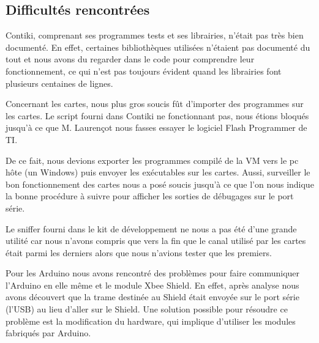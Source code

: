 
\subsection{Difficultés rencontrées}

Contiki, comprenant ses programmes tests et ses librairies, n'était pas très bien documenté.
En effet, certaines bibliothèques utilisées n'étaient pas documenté du tout et nous avons du regarder dans le code pour comprendre leur fonctionnement, ce qui n'est pas toujours évident quand les librairies font plusieurs centaines de lignes.


Concernant les cartes, nous plus gros soucis fût d'importer des programmes sur les cartes.
Le script fourni dans Contiki ne fonctionnant pas, nous étions bloqués jusqu'à ce que M. Laurençot nous fasses essayer le logiciel Flash Programmer de TI.

De ce fait, nous devions exporter les programmes compilé de la VM vers le pc hôte (un Windows) puis envoyer les exécutables sur les cartes.
Aussi, surveiller le bon fonctionnement des cartes nous a posé soucis jusqu'à ce que l'on nous indique la bonne procédure à suivre pour afficher les sorties de débugages sur le port série.


Le sniffer fourni dans le kit de développement ne nous a pas été d'une grande utilité car nous n'avons compris que vers la fin que le canal utilisé par les cartes était parmi les derniers alors que nous n'avions tester que les premiers.  


Pour les Arduino nous avons rencontré des problèmes pour faire communiquer l'Arduino en elle même et le module Xbee Shield. 
En effet, après analyse nous avons découvert que la trame destinée au Shield était envoyée sur le port série (l'USB) au lieu d'aller sur le Shield.
Une solution possible pour résoudre ce problème est la modification du hardware, qui implique d'utiliser les modules fabriqués par Arduino.




